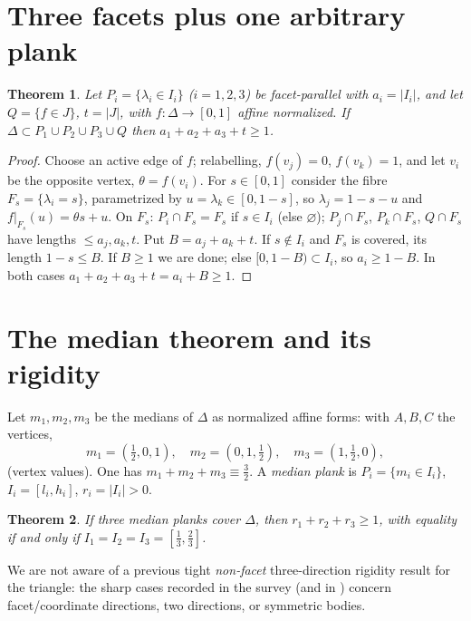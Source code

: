 \documentclass[11pt,reqno]{amsart}
\theoremstyle{plain}
\newtheorem{theorem}{Theorem}[section]
\theoremstyle{definition}
\theoremstyle{remark}
\begin{document}
\section{Three facets plus one arbitrary plank}\label{sec:3plus1}
\begin{theorem}\label{thm:3plus1}
Let $P_i=\{\lambda_i\in I_i\}$ ($i=1,2,3$) be facet-parallel with $a_i=|I_i|$, and
let $Q=\{f\in J\}$, $t=|J|$, with $f:\Delta\to[0,1]$ affine normalized. If
$\Delta\subset P_1\cup P_2\cup P_3\cup Q$ then $a_1+a_2+a_3+t\ge1$.
\end{theorem}
\begin{proof}
Choose an active edge of $f$; relabelling, $f(v_j)=0$, $f(v_k)=1$, and let $v_i$ be
the opposite vertex, $\theta=f(v_i)$. For $s\in[0,1]$ consider the fibre
$F_s=\{\lambda_i=s\}$, parametrized by $u=\lambda_k\in[0,1-s]$, so
$\lambda_j=1-s-u$ and $f|_{F_s}(u)=\theta s+u$. On $F_s$: $P_i\cap F_s=F_s$ if
$s\in I_i$ (else $\varnothing$); $P_j\cap F_s$, $P_k\cap F_s$, $Q\cap F_s$ have
lengths $\le a_j,a_k,t$. Put $B=a_j+a_k+t$. If $s\notin I_i$ and $F_s$ is covered,
its length $1-s\le B$. If $B\ge1$ we are done; else $[0,1-B)\subset I_i$, so
$a_i\ge1-B$. In both cases $a_1+a_2+a_3+t=a_i+B\ge1$.
\end{proof}

\section{The median theorem and its rigidity}\label{sec:median}
Let $m_1,m_2,m_3$ be the medians of $\Delta$ as normalized affine forms: with
$A,B,C$ the vertices,
\[ m_1=(\tfrac12,0,1),\quad m_2=(0,1,\tfrac12),\quad m_3=(1,\tfrac12,0), \]
(vertex values). One has $m_1+m_2+m_3\equiv\tfrac32$. A \emph{median plank} is
$P_i=\{m_i\in I_i\}$, $I_i=[l_i,h_i]$, $r_i=|I_i|>0$.
\begin{theorem}\label{thm:median}
If three median planks cover $\Delta$, then $r_1+r_2+r_3\ge1$, with equality if and
only if $I_1=I_2=I_3=[\tfrac13,\tfrac23]$.
\end{theorem}
We are not aware of a previous tight \emph{non-facet} three-direction rigidity
result for the triangle: the sharp cases recorded in the survey
\cite{Verreault} (and in \cite{Gardner88,BY26}) concern facet/coordinate directions,
two directions, or symmetric bodies.
\end{document}
